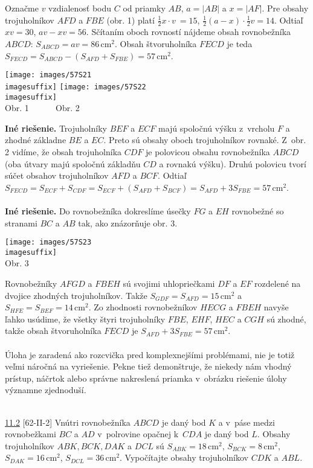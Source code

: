 \rieh Označme $v$ vzdialenosť bodu $C$ od priamky $AB$, $a = |AB|$ a $x = |AF|$. Pre obsahy trojuholníkov $AFD$ a $FBE$ (obr. 1) platí $\frac{1}{2}x\cdot v~= 15$, $\frac{1}{2}(a - x) \cdot \frac{1}{2}v = 14$. Odtiaľ $xv = 30$, $av - xv = 56$. Sčítaním oboch rovností nájdeme obsah rovnobežníka $ABCD$: $S_{ABCD} = av = 86$\,cm$^2$. Obsah štvoruholníka $FECD$ je teda $S_{FECD} = S_{ABCD}- (S_{AFD} + S_ {FBE}) = 57$\,cm$^2.$
\begin{center}
\texttt{[image: images/57S21\\imagesuffix]} \texttt{[image: images/57S22\\imagesuffix]}\\

Obr. 1  \ \ \ \ \ \hspace{130pt} Obr. 2
\end{center}
\textbf{Iné riešenie.} Trojuholníky $BEF$ a $ECF$ majú spoločnú výšku z~vrcholu $F$ a zhodné základne $BE$ a $EC$. Preto sú obsahy oboch trojuholníkov rovnaké. Z~obr. 2 vidíme, že obsah trojuholníka $CDF$ je polovicou obsahu rovnobežníka $ABCD$ (oba útvary majú spoločnú základňu $CD$ a rovnakú výšku). Druhú polovicu tvorí súčet obsahov trojuholníkov $AFD$ a $BCF$. Odtiaľ $S_{FECD} = S_{ECF} + S_{CDF} = S_{ECF} + (S_{AFD} + S_{BCF}) = S_{AFD} + 3 S_{FBE} = 57$\,cm$^2$.\\
\\
\textbf{Iné riešenie.} Do rovnobežníka dokreslíme úsečky $FG$ a $EH$ rovnobežné so stranami $BC$ a $AB$ tak, ako znázorňuje obr. 3.
\begin{center}
\texttt{[image: images/57S23\\imagesuffix]}\\

Obr. 3
\end{center}
Rovnobežníky $AFGD$ a $FBEH$ sú svojimi uhlopriečkami $DF$ a $EF$ rozdelené na dvojice zhodných trojuholníkov. Takže $S_{GDF} = S_{AFD} = 15$\,cm$^2$ a $S_{HFE} = S_{BEF} = 14$\,cm$^2$. Zo zhodnosti rovnobežníkov $HECG$ a $FBEH$ navyše ľahko usúdime, že všetky štyri trojuholníky $FBE$, $EHF$, $HEC$ a $CGH$ sú zhodné, takže obsah štvoruholníka $FECD$ je $S_{AFD} + 3S_{FBE} = 57$\,cm$^2$.\\
\\
\kom Úloha je zaradená ako rozcvička pred komplexnejšími problémami, nie je totiž veľmi náročná na vyriešenie. Pekne tiež demonštruje, že niekedy nám vhodný prístup, náčrtok alebo správne nakreslená priamka v~obrázku riešenie úlohy významne zjednoduší.\\
\\
\begin{tcolorbox}[breakable,notitle,boxrule=0pt,colback=light-gray,colframe=light-gray]\ul{11.2} [62-II-2] Vnútri rovnobežníka $ABCD$ je daný bod $K$ a v~páse medzi rovnobežkami $BC$ a $AD$ v~polrovine opačnej k~$CDA$ je daný bod $L$. Obsahy trojuholníkov $ABK, BCK, DAK$ a $DCL$ sú $S_{ABK} = 18$\,cm$^2$, $S_{BCK} = 8$\,cm$^2$, $S_{DAK} = 16$\,cm$^2$, $S_{DCL} = 36$\,cm$^2$. Vypočítajte obsahy trojuholníkov $CDK$ a $ABL$.

\end{tcolorbox}

